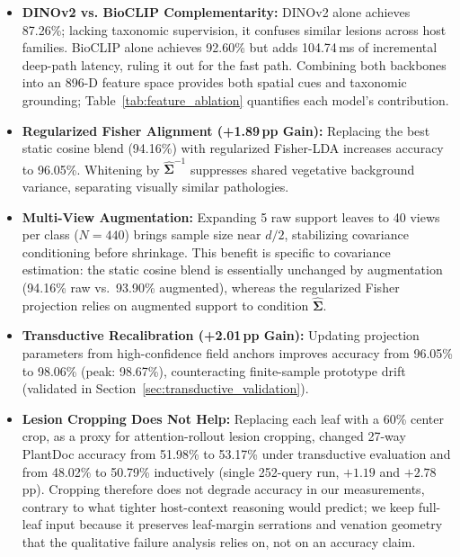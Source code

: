 \begin{itemize}
    \item \textbf{DINOv2 vs. BioCLIP Complementarity:} DINOv2 alone achieves 87.26\%; lacking taxonomic supervision, it confuses similar lesions across host families. BioCLIP alone achieves 92.60\% but adds 104.74\,ms of incremental deep-path latency, ruling it out for the fast path. Combining both backbones into an 896-D feature space provides both spatial cues and taxonomic grounding; Table~\ref{tab:feature_ablation} quantifies each model's contribution.
    \item \textbf{Regularized Fisher Alignment (+1.89\,pp Gain):} Replacing the best static cosine blend (94.16\%) with regularized Fisher-LDA increases accuracy to 96.05\%. Whitening by $\hat{\mathbf{\Sigma}}^{-1}$ suppresses shared vegetative background variance, separating visually similar pathologies.
    \item \textbf{Multi-View Augmentation:} Expanding 5 raw support leaves to 40 views per class ($N=440$) brings sample size near $d/2$, stabilizing covariance conditioning before shrinkage. This benefit is specific to covariance estimation: the static cosine blend is essentially unchanged by augmentation (94.16\% raw vs.\ 93.90\% augmented), whereas the regularized Fisher projection relies on augmented support to condition $\hat{\mathbf{\Sigma}}$.
    \item \textbf{Transductive Recalibration (+2.01\,pp Gain):} Updating projection parameters from high-confidence field anchors improves accuracy from 96.05\% to 98.06\% (peak: 98.67\%), counteracting finite-sample prototype drift (validated in Section~\ref{sec:transductive_validation}).
    \item \textbf{Lesion Cropping Does Not Help:} Replacing each leaf with a 60\% center crop, as a proxy for attention-rollout lesion cropping, changed 27-way PlantDoc accuracy from 51.98\% to 53.17\% under transductive evaluation and from 48.02\% to 50.79\% inductively (single 252-query run, $+1.19$ and $+2.78$\,pp). Cropping therefore does not degrade accuracy in our measurements, contrary to what tighter host-context reasoning would predict; we keep full-leaf input because it preserves leaf-margin serrations and venation geometry that the qualitative failure analysis relies on, not on an accuracy claim.
\end{itemize}

